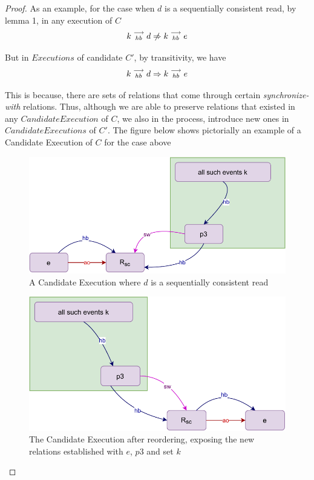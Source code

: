 \begin{proof}
        As an example, for the case when $d$ is a sequentially consistent read, by lemma 1, in any execution of $C$
        \[
            \reln{k}{hb}{d} \centernot\Rightarrow \reln{k}{hb}{e} 
        \]

        But in $Executions$ of candidate $C'$, by transitivity, we have 
        \[
            k\stackrel{\longrightarrow}{_{hb}}d \Rightarrow k\stackrel{\longrightarrow}{_{hb}}e 
        \]
        
        This is because, there are sets of relations that come through certain \textit{synchronize-with} relations. Thus, although we are able to preserve relations that existed in any $Candidate Execution$ of $C$, we also in the process, introduce new ones in $Candidate Executions$ of $C'$. The figure below shows pictorially an example of a Candidate Execution of $C$ for the case above 
        
        \begin{figure}[H]
            \centering
            \includegraphics[scale=0.7]{Q2(c).pdf}
            \caption{A Candidate Execution where $d$ is a sequentially consistent read}
            \label{fig:my_label}
        \end{figure}
        
        \begin{figure}[H]
            \centering
            \includegraphics[scale=0.7]{Q2(d).pdf}
            \caption{The Candidate Execution after reordering, exposing the new relations established with $e$, $p3$ and set $k$}
            \label{fig:my_label}
        \end{figure}
        

\end{proof}

